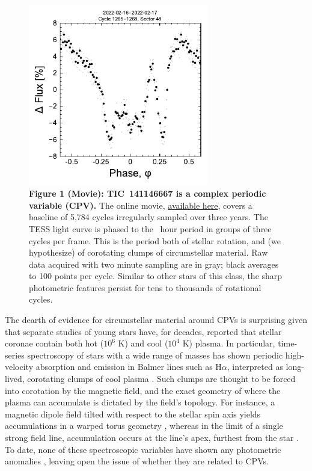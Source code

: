 \documentclass{nature3}
\begin{document}
\begin{figure}[!t]
  \centering
  \includegraphics[width=0.7\textwidth]{figures/f1.pdf}
  \captionsetup{labelformat=empty}
  \caption{{\bf Figure 1 (Movie):  TIC~141146667 is a complex periodic
  variable (CPV).}  The online movie,
  \href{https://lgbouma.com/movies/TIC141146667_20250116.mp4}{available here},
  covers a baseline of 5{,}784 cycles irregularly sampled over three
  years.  The TESS light curve is phased to the \periodhr\ hour period
  in groups of three cycles per frame.  This is the period both of
  stellar rotation, and (we hypothesize) of corotating clumps of
  circumstellar material.  Raw data acquired with two minute sampling
  are in gray; black averages to 100 points per cycle.  Similar to
  other stars of this class, the sharp photometric features persist
  for tens to thousands of rotational cycles. }
  \label{fig:lc}
\end{figure}

The dearth of evidence for circumstellar material around CPVs is
surprising given that separate studies of young stars have, for
decades, reported that stellar coronae contain both hot ($10^6$ K) and
cool ($10^4$ K) plasma. In particular, time-series spectroscopy of
stars with a wide range of masses has shown periodic high-velocity
absorption and emission in Balmer lines such as H$\alpha$, interpreted
as long-lived, corotating clumps of cool plasma
\cite{CollierCameron1989,CollierCameron1992,Barnes2000,Donati2000,Dunstone2006,Skelly2008,Leitzinger2016,Cang2021}.
Such clumps are thought to be forced into corotation by the magnetic
field, and the exact geometry of where the plasma can accumulate is
dictated by the field's topology.  For instance, a magnetic dipole
field tilted with respect to the stellar spin axis yields
accumulations in a warped torus geometry \cite{Townsend2005}, whereas
in the limit of a single strong field line, accumulation occurs at the
line's apex, furthest from the star \cite{Waugh2022}.  To date, none
of these spectroscopic variables have shown any photometric anomalies
\cite{Bouma2024}, leaving open the issue of whether they are related
to CPVs.
\end{document}
